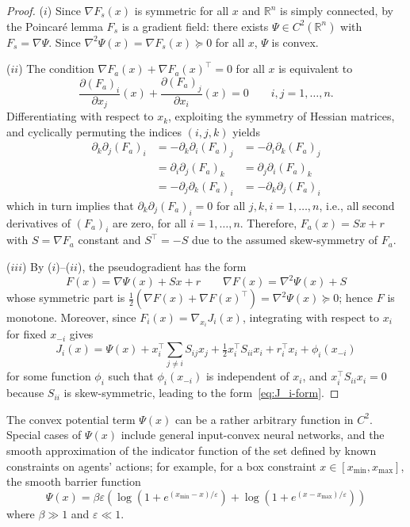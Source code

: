 \documentclass[11pt, a4paper]{article}
\newcommand{\rr}{\mathbb{R}}
\theoremstyle{remark}
\theoremstyle{plain}
\begin{document}
\begin{proof}
($i$) Since $\nabla F_s(x)$ is symmetric for all $x$ and $\rr^n$ is
simply connected, by the Poincar\'e lemma $F_s$ is a gradient field:
there exists $\Psi\in C^2(\rr^n)$ with $F_s=\nabla\Psi$. Since
$\nabla^2\Psi(x)=\nabla F_s(x)\succeq0$ for all $x$, $\Psi$ is convex.

($ii$) The condition $\nabla F_a(x)+\nabla F_a(x)^\top=0$ for all $x$ is equivalent to
\begin{equation}
\frac{\partial (F_a)_i}{\partial x_j}(x)
+\frac{\partial (F_a)_j}{\partial x_i}(x)=0
\qquad i,j=1,\ldots,n.
\label{eq:Killing}
\end{equation}
Differentiating with respect to $x_k$,
exploiting the symmetry of Hessian matrices,
and cyclically permuting the indices
$(i,j,k)$ yields
\[
\begin{aligned}
\partial_k\partial_j (F_a)_i 
&=-\partial_k\partial_i (F_a)_j 
&=-\partial_i\partial_k (F_a)_j\\
&=\partial_i\partial_j (F_a)_k 
&=\partial_j\partial_i (F_a)_k \\
&=-\partial_j\partial_k (F_a)_i & = -\partial_k\partial_j (F_a)_i
\end{aligned}
\]
which in turn implies that $\partial_k\partial_j (F_a)_i=0$ for all $j,k,i=1,\ldots,n$, i.e., all second derivatives of $(F_a)_i$ are zero, for all $i=1,\ldots,n$.
Therefore, $F_a(x)=Sx+r$ with $S=\nabla F_a$ constant and $S^\top=-S$ due to the assumed skew-symmetry of $F_a$.

($iii$) By ($i$)--($ii$), the pseudogradient has the form
\[
F(x)=\nabla\Psi(x)+Sx+r
\qquad
\nabla F(x)=\nabla^2\Psi(x)+S
\]
whose symmetric part is $\tfrac{1}{2}(\nabla F(x)+\nabla F(x)^\top)=\nabla^2\Psi(x)\succeq0$; hence $F$ is monotone.
Moreover, since $F_i(x)=\nabla_{x_i}J_i(x)$, integrating with respect to
$x_i$ for fixed $x_{-i}$ gives
\[
J_i(x)
=\Psi(x)+x_i^\top\sum_{j\neq i}S_{ij}x_j
+\tfrac12x_i^\top S_{ii}x_i+r_i^\top x_i+\phi_i(x_{-i})
\]
for some function $\phi_i$ such that $\phi_i(x_{-i})$ is independent of $x_i$, and $x_i^\top S_{ii}x_i=0$ because $S_{ii}$ is skew-symmetric, leading to the form~\eqref{eq:J_i-form}.
\end{proof}
The convex potential term $\Psi(x)$ can be a rather arbitrary function in $C^2$. Special cases of $\Psi(x)$ include general input-convex neural networks,
and the smooth approximation of the indicator function of the set defined by known constraints on agents' actions; for example, for a box constraint $x\in[x_{\min},x_{\max}]$, the smooth barrier function
\[
\Psi(x)
=\beta\varepsilon
\left(
\log\!\left(1+e^{(x_{\min}-x)/\varepsilon}\right)
+
\log\!\left(1+e^{(x-x_{\max})/\varepsilon}\right)
\right)
\]
where $\beta\gg 1$ and $\varepsilon\ll 1$. 
\end{document}
